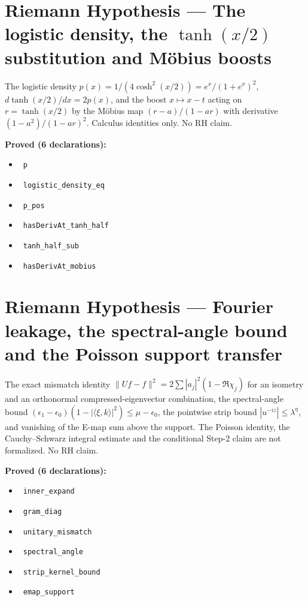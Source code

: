 \documentclass{report}
\theoremstyle{definition}
\begin{document}
\section{Riemann Hypothesis --- The logistic density, the $\tanh(x/2)$ substitution and M\"obius boosts}
The logistic density $p(x)=1/(4\cosh^2(x/2))=e^x/(1+e^x)^2$, $d\tanh(x/2)/dx=2p(x)$, and the boost $x\mapsto x-t$ acting on $r=\tanh(x/2)$ by the M\"obius map $(r-a)/(1-ar)$ with derivative $(1-a^2)/(1-ar)^2$. Calculus identities only. No RH claim.

\noindent\textbf{Proved (6 declarations):}
\begin{itemize}
  \item {}\leanok\ \texttt{p}
  \item {}\leanok\ \texttt{logistic\_density\_eq}
  \item {}\leanok\ \texttt{p\_pos}
  \item {}\leanok\ \texttt{hasDerivAt\_tanh\_half}
  \item {}\leanok\ \texttt{tanh\_half\_sub}
  \item {}\leanok\ \texttt{hasDerivAt\_mobius}
\end{itemize}

\section{Riemann Hypothesis --- Fourier leakage, the spectral-angle bound and the Poisson support transfer}
The exact mismatch identity $\|Uf-f\|^2=2\sum|a_j|^2(1-\Re\chi_j)$ for an isometry and an orthonormal compressed-eigenvector combination, the spectral-angle bound $(\epsilon_1-\epsilon_0)(1-|\langle\xi,k\rangle|^2)\le\mu-\epsilon_0$, the pointwise strip bound $|u^{-iz}|\le\lambda^\eta$, and vanishing of the E-map sum above the support. The Poisson identity, the Cauchy--Schwarz integral estimate and the conditional Step-2 claim are not formalized. No RH claim.

\noindent\textbf{Proved (6 declarations):}
\begin{itemize}
  \item {}\leanok\ \texttt{inner\_expand}
  \item {}\leanok\ \texttt{gram\_diag}
  \item {}\leanok\ \texttt{unitary\_mismatch}
  \item {}\leanok\ \texttt{spectral\_angle}
  \item {}\leanok\ \texttt{strip\_kernel\_bound}
  \item {}\leanok\ \texttt{emap\_support}
\end{itemize}
\end{document}
